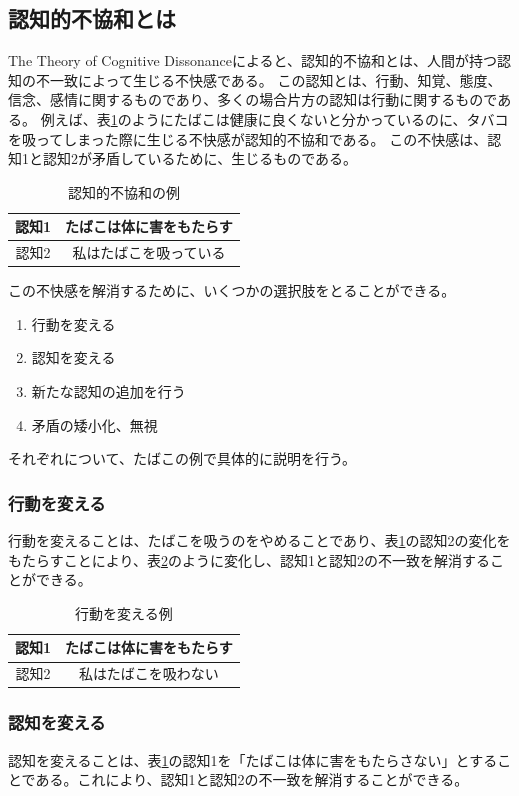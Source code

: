 \documentclass[11pt,a4j]{jreport}
\begin{document}
\subsection{認知的不協和とは} %
\label{sec: CDT}
The Theory of Cognitive Dissonance\cite{Festinger1957}によると、認知的不協和とは、人間が持つ認知の不一致によって生じる不快感である。
この認知とは、行動、知覚、態度、信念、感情に関するものであり、多くの場合片方の認知は行動に関するものである。
例えば、表\ref{fig: CDTExample}のようにたばこは健康に良くないと分かっているのに、タバコを吸ってしまった際に生じる不快感が認知的不協和である。
この不快感は、認知1と認知2が矛盾しているために、生じるものである。
\begin{table}[h]
  \centering
  \caption{認知的不協和の例}
  \label{fig: CDTExample}
  \begin{tabular}{c|c}
      認知1 & たばこは体に害をもたらす  \\ \hline
      認知2 & 私はたばこを吸っている \\
  \end{tabular}
\end{table}


この不快感を解消するために、いくつかの選択肢をとることができる。
\begin{enumerate}
  \item 行動を変える
  \item 認知を変える
  \item 新たな認知の追加を行う
  \item 矛盾の矮小化、無視
\end{enumerate}
それぞれについて、たばこの例で具体的に説明を行う。
\subsubsection{行動を変える}
行動を変えることは、たばこを吸うのをやめることであり、表\ref{fig: CDTExample}の認知2の変化をもたらすことにより、表\ref{fig: ReduceDissonanceAction}のように変化し、認知1と認知2の不一致を解消することができる。
\begin{table}[h]
  \centering
  \caption{行動を変える例}
  \label{fig: ReduceDissonanceAction}
  \begin{tabular}{c|c}
      認知1 & たばこは体に害をもたらす  \\ \hline
      認知2 & 私はたばこを吸わない \\ \hline
  \end{tabular}
\end{table}

\subsubsection{認知を変える}
認知を変えることは、表\ref{fig: CDTExample}の認知1を「たばこは体に害をもたらさない」とすることである。これにより、認知1と認知2の不一致を解消することができる。
\end{document}
